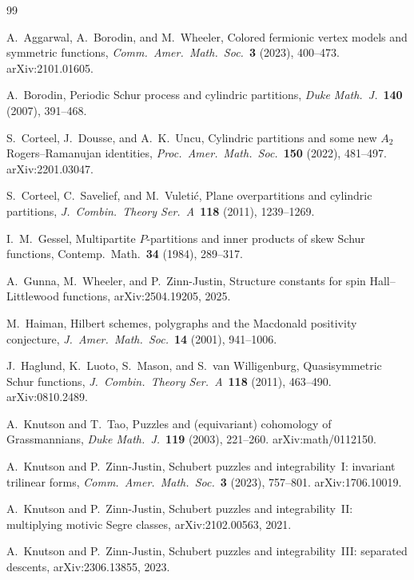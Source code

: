 \documentclass[11pt]{article}
\theoremstyle{plain}
\theoremstyle{definition}
\theoremstyle{remark}
\begin{document}
\begin{thebibliography}{99}

A.~Aggarwal, A.~Borodin, and M.~Wheeler,
Colored fermionic vertex models and symmetric functions,
\emph{Comm.\ Amer.\ Math.\ Soc.}\ \textbf{3} (2023), 400--473.
arXiv:2101.01605.

A.~Borodin,
Periodic Schur process and cylindric partitions,
\emph{Duke Math.\ J.}\ \textbf{140} (2007), 391--468.

S.~Corteel, J.~Dousse, and A.~K.~Uncu,
Cylindric partitions and some new $A_2$ Rogers--Ramanujan
identities, \emph{Proc.\ Amer.\ Math.\ Soc.}\ \textbf{150}
(2022), 481--497.
arXiv:2201.03047.

S.~Corteel, C.~Savelief, and M.~Vuleti\'c,
Plane overpartitions and cylindric partitions,
\emph{J.\ Combin.\ Theory Ser.\ A}\ \textbf{118} (2011), 1239--1269.

I.~M.~Gessel,
Multipartite $P$-partitions and inner products of skew Schur
functions,
Contemp.\ Math.\ \textbf{34} (1984), 289--317.

A.~Gunna, M.~Wheeler, and P.~Zinn-Justin,
Structure constants for spin Hall--Littlewood functions,
arXiv:2504.19205, 2025.

M.~Haiman,
Hilbert schemes, polygraphs and the Macdonald positivity
conjecture,
\emph{J.~Amer.\ Math.\ Soc.}\ \textbf{14} (2001), 941--1006.

J.~Haglund, K.~Luoto, S.~Mason, and S.~van Willigenburg,
Quasisymmetric Schur functions,
\emph{J.\ Combin.\ Theory Ser.\ A}\ \textbf{118} (2011), 463--490.
arXiv:0810.2489.

A.~Knutson and T.~Tao,
Puzzles and (equivariant) cohomology of Grassmannians,
\emph{Duke Math.\ J.}\ \textbf{119} (2003), 221--260.
arXiv:math/0112150.

A.~Knutson and P.~Zinn-Justin,
Schubert puzzles and integrability~I: invariant trilinear forms,
\emph{Comm.\ Amer.\ Math.\ Soc.}\ \textbf{3} (2023), 757--801.
arXiv:1706.10019.

A.~Knutson and P.~Zinn-Justin,
Schubert puzzles and integrability~II: multiplying motivic Segre
classes,
arXiv:2102.00563, 2021.

A.~Knutson and P.~Zinn-Justin,
Schubert puzzles and integrability~III: separated descents,
arXiv:2306.13855, 2023.


\end{thebibliography}
\end{document}
